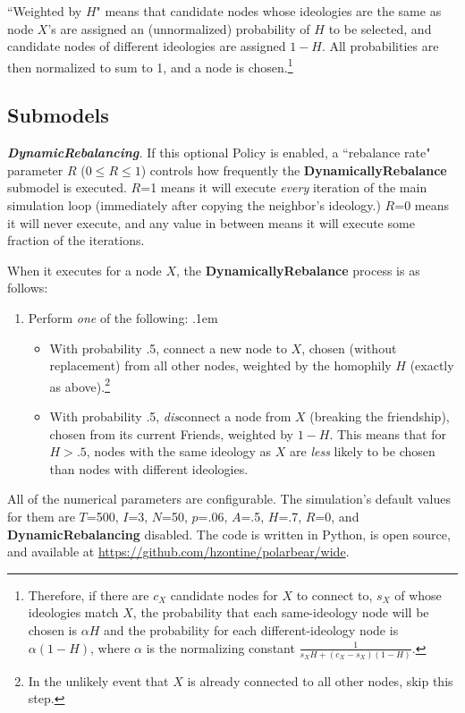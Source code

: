 ``Weighted by $H$" means that candidate nodes whose ideologies are the same as
node $X$'s are assigned an (unnormalized) probability of $H$ to be selected,
and candidate nodes of different ideologies are assigned $1-H$. All
probabilities are then normalized to sum to 1, and a node is chosen.\footnote{
Therefore, if there are $c_X$ candidate nodes for $X$ to connect to, $s_X$ of
whose ideologies match $X$, the probability that each same-ideology node will
be chosen is $\alpha H$ and the probability for each different-ideology node
is $\alpha (1-H)$, where $\alpha$ is the normalizing constant $\frac{1}{s_X H
+ (c_X-s_X)(1-H)}$.}



\subsection{Submodels}

\textit{\textbf{DynamicRebalancing}.} If this optional Policy is enabled, a
``rebalance rate" parameter $R$ ($0 \leq R \leq 1$) controls how frequently
the \textbf{DynamicallyRebalance} submodel is executed. $R$=1 means it will
execute \textit{every} iteration of the main simulation loop (immediately
after copying the neighbor's ideology.) $R$=0 means it will never execute, and
any value in between means it will execute some fraction of the iterations.

When it executes for a node $X$, the \textbf{DynamicallyRebalance} process is
as follows:
\begin{enumerate}
\item Perform \textit{one} of the following:
\itemsep.1em
\begin{itemize}
\item With probability .5, connect a new node to $X$, chosen (without
replacement) from all other nodes, weighted by the homophily $H$ (exactly as
above).\footnote{In the unlikely event that $X$ is already connected to all
other nodes, skip this step.}
\item With probability .5, \textit{dis}connect a node from $X$ (breaking the
friendship), chosen from its current Friends, weighted by $1-H$. This means
that for $H>.5$, nodes with the same ideology as $X$ are \textit{less} likely
to be chosen than nodes with different ideologies.
\end{itemize}
\end{enumerate}


All of the numerical parameters are configurable. The simulation's default
values for them are $T$=500, $I$=3, $N$=50, $p$=.06, $A$=.5, $H$=.7, $R$=0,
and \textbf{DynamicRebalancing} disabled. The code is written in Python, is
open source, and available at
\url{https://github.com/hzontine/polarbear/wide}.
